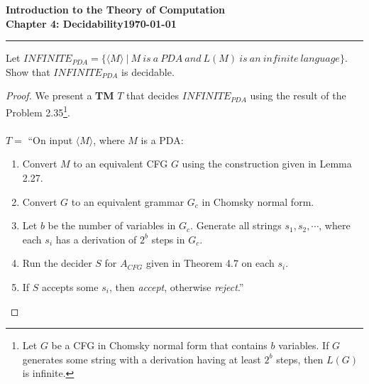 \documentclass[11pt]{article}
\newcommand{\dated}{\today}
\begin{document}
\textbf{Introduction to the Theory of
Computation}\hfill\textbf{\myname}\\[0.01in]
\textbf{Chapter 4: Decidability}\hfill\textbf{\dated}\\
\smallskip\hrule\bigskip

\begin{problem}{4.11}
Let $INFINITE_{PDA} = \{\langle M \rangle \ | \ M \ is \ a \ PDA \ and \  L(M)\  is \ an \ infinite \ language\}$. Show that $INFINITE_{PDA}$ is decidable.
\end{problem}

\begin{proof}
We present a \textbf{TM} $T$ that decides $INFINITE_{PDA}$ using the result of the Problem 2.35\footnote{Let $G$ be a CFG in Chomsky normal form that contains $b$ variables. If $G$ generates some string with a derivation having at least $2^b$ steps, then $L(G)$ is infinite.}.  \\
\\
$T =$ \textquotedblleft On input $\langle M \rangle$, where $M$ is a PDA:
\begin{enumerate}
\item Convert $M$ to an equivalent CFG $G$ using the construction given in Lemma 2.27.
\item Convert $G$ to an equivalent grammar $G_c$ in Chomsky normal form.
\item Let $b$ be the number of variables in $G_c$. Generate all strings $s_1, s_2, \cdots$, where each $s_i$ has a derivation of $2^b$ steps in $G_c$.
\item Run the decider $S$ for $A_{CFG}$ given in Theorem 4.7 on each $s_i$.
\item If $S$ accepts some $s_i$, then \textit{accept}, otherwise \textit{reject}.\textquotedblright
\end{enumerate}

\end{proof}
\end{document}
